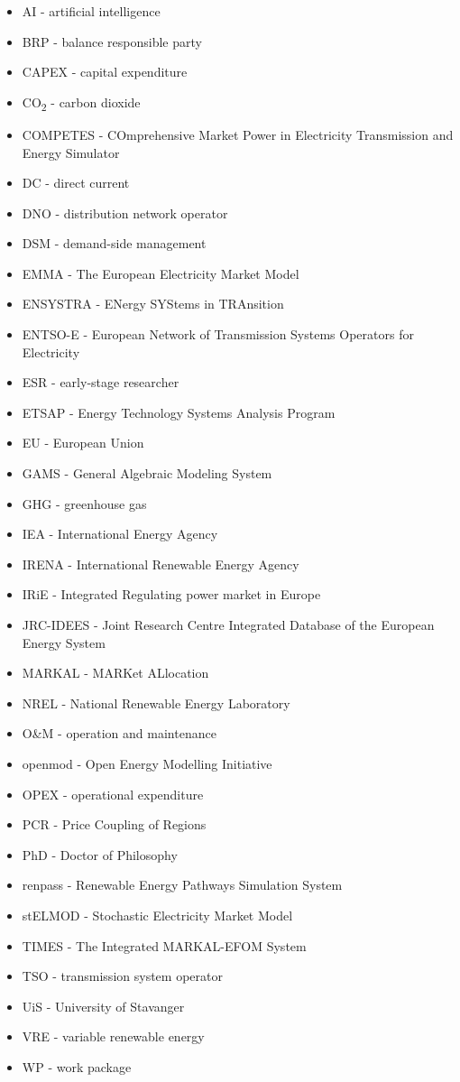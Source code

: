 \begin{itemize}
\tightlist
\item
  AI - artificial intelligence
\item
  BRP - balance responsible party
\item
  CAPEX - capital expenditure
\item
  CO\textsubscript{2} - carbon dioxide
\item
  COMPETES - COmprehensive Market Power in Electricity Transmission and
  Energy Simulator
\item
  DC - direct current
\item
  DNO - distribution network operator
\item
  DSM - demand-side management
\item
  EMMA - The European Electricity Market Model
\item
  ENSYSTRA - ENergy SYStems in TRAnsition
\item
  ENTSO-E - European Network of Transmission Systems Operators for
  Electricity
\item
  ESR - early-stage researcher
\item
  ETSAP - Energy Technology Systems Analysis Program
\item
  EU - European Union
\item
  GAMS - General Algebraic Modeling System
\item
  GHG - greenhouse gas
\item
  IEA - International Energy Agency
\item
  IRENA - International Renewable Energy Agency
\item
  IRiE - Integrated Regulating power market in Europe
\item
  JRC-IDEES - Joint Research Centre Integrated Database of the European
  Energy System
\item
  MARKAL - MARKet ALlocation
\item
  NREL - National Renewable Energy Laboratory
\item
  O\&M - operation and maintenance
\item
  openmod - Open Energy Modelling Initiative
\item
  OPEX - operational expenditure
\item
  PCR - Price Coupling of Regions
\item
  PhD - Doctor of Philosophy
\item
  renpass - Renewable Energy Pathways Simulation System
\item
  stELMOD - Stochastic Electricity Market Model
\item
  TIMES - The Integrated MARKAL-EFOM System
\item
  TSO - transmission system operator
\item
  UiS - University of Stavanger
\item
  VRE - variable renewable energy
\item
  WP - work package
\end{itemize}
